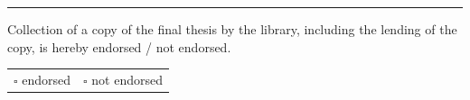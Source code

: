 \signature{Signature of student}

\vspace{6mm}
\hrule
\nointerlineskip{}
\begingroup
\setlength{\topsep}{0pt}\setlength{\parskip}{0pt}
\begin{center}
	{}
\end{center}
\endgroup

Collection of a copy of the final thesis by the library, including the lending of the copy, is hereby endorsed / not endorsed.

\begin{tabular}{@{}ll@{}}
	\qquad$\square$ endorsed & \qquad$\square$ not endorsed \\
\end{tabular}

\signature{Signature of first examiner}
\cleardoublepage\par